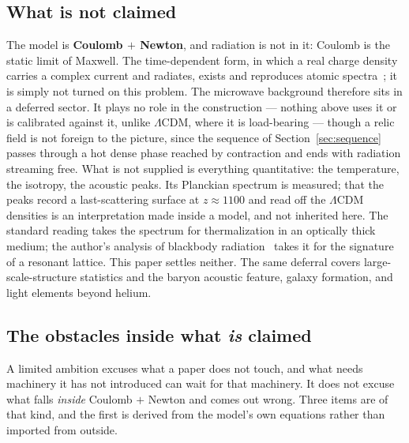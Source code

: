 \documentclass[11pt]{article}
\begin{document}
\subsection*{What is not claimed}
The model is \textbf{Coulomb $+$ Newton}, and radiation is not in it: Coulomb is the static limit of Maxwell. The
time-dependent form, in which a real charge density carries a complex current and radiates, exists and reproduces
atomic spectra~\cite{complexrealqm}; it is simply not turned on this problem. The microwave background therefore
sits in a deferred sector. It plays no role in the construction --- nothing above uses it or is calibrated against
it, unlike $\Lambda$CDM, where it is load-bearing --- though a relic field is not foreign to the picture, since
the sequence of Section~\ref{sec:sequence} passes through a hot dense phase reached by contraction and ends with
radiation streaming free. What is not supplied is everything quantitative: the temperature, the isotropy, the
acoustic peaks. Its Planckian spectrum is measured; that the peaks record a last-scattering surface at
$z\approx1100$ and read off the $\Lambda$CDM densities is an interpretation made inside a model, and not
inherited here. The standard reading takes the spectrum for thermalization in an optically thick medium; the
author's analysis of blackbody radiation~\cite{blackbody} takes it for the signature of a resonant lattice. This
paper settles neither. The same deferral covers large-scale-structure statistics and the baryon acoustic feature,
galaxy formation, and light elements beyond helium.

\subsection*{The obstacles inside what \emph{is} claimed}
A limited ambition excuses what a paper does not touch, and what needs machinery it has not introduced can wait
for that machinery. It does not excuse what falls \emph{inside} Coulomb $+$ Newton and comes out wrong. Three
items are of that kind, and the first is derived from the model's own equations rather than imported from
outside.
\end{document}
